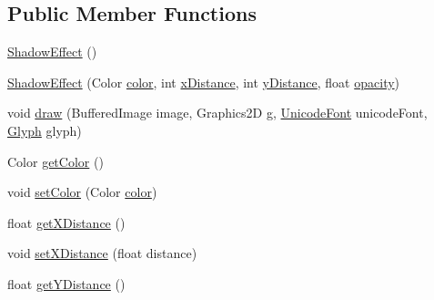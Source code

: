 \subsection*{Public Member Functions}
\begin{DoxyCompactItemize}
\item 
\mbox{\hyperlink{classorg_1_1newdawn_1_1slick_1_1font_1_1effects_1_1_shadow_effect_a43a9216175f4935883c4b403633123b3}{Shadow\+Effect}} ()
\item 
\mbox{\hyperlink{classorg_1_1newdawn_1_1slick_1_1font_1_1effects_1_1_shadow_effect_ab4d81701c9e8f79a1d79bf19e2bb8fab}{Shadow\+Effect}} (Color \mbox{\hyperlink{classorg_1_1newdawn_1_1slick_1_1font_1_1effects_1_1_shadow_effect_a4a5a1c31b38b33b042cadabe1593bc62}{color}}, int \mbox{\hyperlink{classorg_1_1newdawn_1_1slick_1_1font_1_1effects_1_1_shadow_effect_a4d3581fba8877de112c8a1ec28cdf03d}{x\+Distance}}, int \mbox{\hyperlink{classorg_1_1newdawn_1_1slick_1_1font_1_1effects_1_1_shadow_effect_a06d791511d507ab313c764edbde43fa8}{y\+Distance}}, float \mbox{\hyperlink{classorg_1_1newdawn_1_1slick_1_1font_1_1effects_1_1_shadow_effect_a6a03f4db2ffd55023ab5f9fde923dc0e}{opacity}})
\item 
void \mbox{\hyperlink{classorg_1_1newdawn_1_1slick_1_1font_1_1effects_1_1_shadow_effect_acd0d914b52c834f91becf289e7f6613e}{draw}} (Buffered\+Image image, Graphics2D g, \mbox{\hyperlink{classorg_1_1newdawn_1_1slick_1_1_unicode_font}{Unicode\+Font}} unicode\+Font, \mbox{\hyperlink{classorg_1_1newdawn_1_1slick_1_1font_1_1_glyph}{Glyph}} glyph)
\item 
Color \mbox{\hyperlink{classorg_1_1newdawn_1_1slick_1_1font_1_1effects_1_1_shadow_effect_a3d8ff47299ece9d528f81e0ea9ef9cba}{get\+Color}} ()
\item 
void \mbox{\hyperlink{classorg_1_1newdawn_1_1slick_1_1font_1_1effects_1_1_shadow_effect_afca88dd56fbc192fabcd8853a7077532}{set\+Color}} (Color \mbox{\hyperlink{classorg_1_1newdawn_1_1slick_1_1font_1_1effects_1_1_shadow_effect_a4a5a1c31b38b33b042cadabe1593bc62}{color}})
\item 
float \mbox{\hyperlink{classorg_1_1newdawn_1_1slick_1_1font_1_1effects_1_1_shadow_effect_ab7680af9a2aa5bf7f58a6b5a3fdeab01}{get\+X\+Distance}} ()
\item 
void \mbox{\hyperlink{classorg_1_1newdawn_1_1slick_1_1font_1_1effects_1_1_shadow_effect_a54f2fa7fffee72d539ab3d54a3afc4c9}{set\+X\+Distance}} (float distance)
\item 
float \mbox{\hyperlink{classorg_1_1newdawn_1_1slick_1_1font_1_1effects_1_1_shadow_effect_ab7c31d1bb3fd1ff678bfd01babe4052e}{get\+Y\+Distance}} ()

\end{DoxyCompactItemize}
